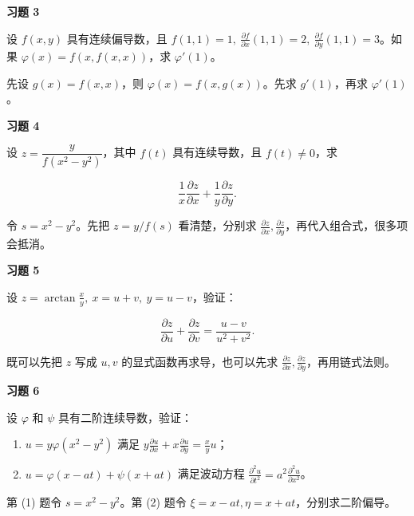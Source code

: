\begin{exercisebox}
\textbf{习题 3}

设 \(f(x,y)\) 具有连续偏导数，且 \(f(1,1)=1,\ \frac{\partial f}{\partial x}(1,1)=2,\ \frac{\partial f}{\partial y}(1,1)=3\)。如果 \(\varphi(x)=f(x,f(x,x))\)，求 \(\varphi'(1)\)。

\begin{hintbox}
先设 \(g(x)=f(x,x)\)，则 \(\varphi(x)=f(x,g(x))\)。先求 \(g'(1)\)，再求 \(\varphi'(1)\)。
\end{hintbox}
\end{exercisebox}

\begin{exercisebox}
\textbf{习题 4}

设 \(z=\dfrac{y}{f(x^2-y^2)}\)，其中 \(f(t)\) 具有连续导数，且 \(f(t)\ne0\)，求

\[
        \frac1x\frac{\partial z}{\partial x}
        +
        \frac1y\frac{\partial z}{\partial y}.
      \]

\begin{hintbox}
令 \(s=x^2-y^2\)。先把 \(z=y/f(s)\) 看清楚，分别求 \(\frac{\partial z}{\partial x},\frac{\partial z}{\partial y}\)，再代入组合式，很多项会抵消。
\end{hintbox}
\end{exercisebox}

\begin{exercisebox}
\textbf{习题 5}

设 \(z=\arctan\frac{x}{y},\ x=u+v,\ y=u-v\)，验证：

\[
        \frac{\partial z}{\partial u}
        +
        \frac{\partial z}{\partial v}
        =
        \frac{u-v}{u^2+v^2}.
      \]

\begin{hintbox}
既可以先把 \(z\) 写成 \(u,v\) 的显式函数再求导，也可以先求 \(\frac{\partial z}{\partial x},\frac{\partial z}{\partial y}\)，再用链式法则。
\end{hintbox}
\end{exercisebox}

\begin{exercisebox}
\textbf{习题 6}

设 \(\varphi\) 和 \(\psi\) 具有二阶连续导数，验证：

\begin{enumerate}
 \item \(u=y\varphi(x^2-y^2)\) 满足 \(y\frac{\partial u}{\partial x}+x\frac{\partial u}{\partial y}=\frac{x}{y}u\)；
 \item \(u=\varphi(x-at)+\psi(x+at)\) 满足波动方程 \(\frac{\partial^2u}{\partial t^2}=a^2\frac{\partial^2u}{\partial x^2}\)。
 \end{enumerate}

\begin{hintbox}
第 (1) 题令 \(s=x^2-y^2\)。第 (2) 题令 \(\xi=x-at,\eta=x+at\)，分别求二阶偏导。
\end{hintbox}
\end{exercisebox}

